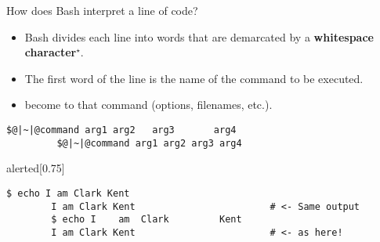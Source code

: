 
\begin{frame}[fragile]{How does Bash interpret a line of code?}
    \begin{itemize}
        \item Bash divides each line into words that are demarcated by a \textbf{whitespace character}$^\star$.
        \item \alert{The first word} of the line is the name of \alert{the command} to be executed.
        \item {} become  to that command (options, filenames, etc.).
    \end{itemize}
    \vfill
    \begin{lstlisting}[style=MyBash, showspaces=true]
         $@|~|@command arg1 arg2   arg3       arg4
         $@|~|@command arg1 arg2 arg3 arg4
    \end{lstlisting}
    \vfill
    \begin{varblock}{alerted}[0.75\textwidth]{}
    \end{varblock}
    \begin{lstlisting}[style=MyBash]
        $ echo I am Clark Kent
        I am Clark Kent                        # <- Same output
        $ echo I    am  Clark         Kent
        I am Clark Kent                        # <- as here!
    \end{lstlisting}
\end{frame}
